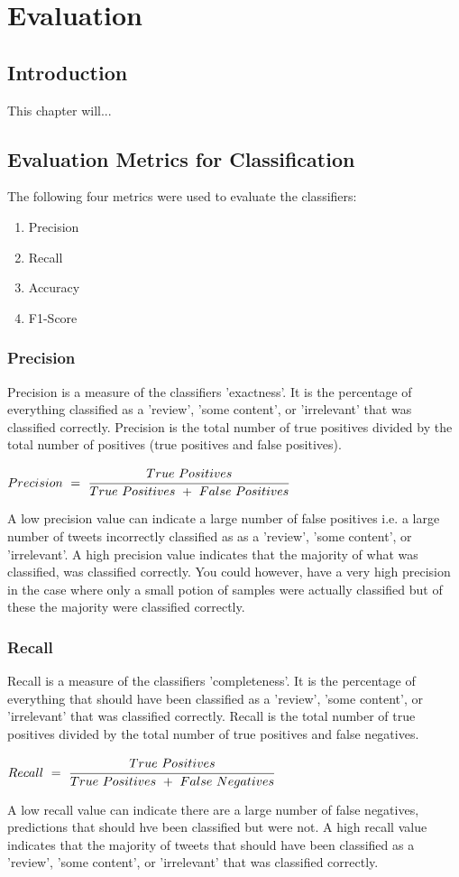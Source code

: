 \chapter{Evaluation}

\section{Introduction}
This chapter will...

\section{Evaluation Metrics for Classification}
The following four metrics were used to evaluate the classifiers:
\begin{enumerate}
    \item Precision
    \item Recall
    \item Accuracy
    \item F1-Score
\end{enumerate}

\subsection*{Precision}
Precision is a measure of the classifiers 'exactness'. It is the percentage of everything classified as a 'review', 'some content', or 'irrelevant' that was classified correctly. Precision is the total number of true positives divided by the total number of positives (true positives and false positives).
\begin{center}
    $Precision\ =\ \cfrac{True\ Positives}{True\ Positives\ +\ False\ Positives}$
\end{center}
A low precision value can indicate a large number of false positives i.e. a large number of tweets incorrectly classified as as a 'review', 'some content', or 'irrelevant'. A high precision value indicates that the majority of what was classified, was classified correctly. You could however, have a very high precision in the case where only a small potion of samples were actually classified but of these the majority were classified correctly.

\subsection*{Recall}
Recall is a measure of the classifiers 'completeness'. It is the percentage of everything that should have been classified as a 'review', 'some content', or 'irrelevant' that was classified correctly. Recall is the total number of true positives divided by the total number of true positives and false negatives.
\begin{center}
    $Recall\ =\ \cfrac{True\ Positives}{True\ Positives\ +\ False\ Negatives}$
\end{center}
A low recall value can indicate there are a large number of false negatives, predictions that should hve been classified but were not. A high recall value indicates that the majority of tweets that should have been classified as a 'review', 'some content', or 'irrelevant' that was classified correctly.


